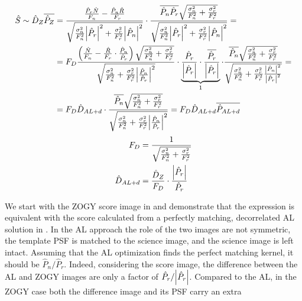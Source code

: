 \begin{align}
  \hat{S} \sim \hat{D}_Z\overline{\hat{P}_Z} &= \frac
  {\frac{\hat{P}_r\hat{N}}{F_n} - \frac{\hat{P}_n\hat{R}}{F_r}}
  {\sqrt{\frac{\sigma_n^2}{F_n^2}\abs{\hat{P}_r}^2 +
      \frac{\sigma_r^2}{F_r^2}\abs{\hat{P}_n}^2}}
  \cdot
  \frac{\overline{\hat{P}_n\hat{P}_r}\sqrt{\frac{\sigma_n^2}{F_n^2} + \frac{\sigma_r^2}{F_r^2}}}
  {\sqrt{\frac{\sigma_n^2}{F_n^2}\abs{\hat{P}_r}^2 +
      \frac{\sigma_r^2}{F_r^2}\abs{\hat{P}_n}^2}} = \label{eq:DzPz}\\
 &= F_D \frac
  {\left(\frac{\hat{N}}{F_n} -  \frac{\hat{R}}{F_r} \cdot
    \frac{\hat{P}_n}{\hat{P}_r}\right) \sqrt{\frac{\sigma_n^2}{F_n^2} + \frac{\sigma_r^2}{F_r^2}} }
  {\sqrt{\frac{\sigma_n^2}{F_n^2} +
      \frac{\sigma_r^2}{F_r^2}\abs{\frac{\hat{P}_n}{\hat{P}_r}}^2}}
  \cdot
  \underbrace{
  \frac{\hat{P}_r}{\abs{\hat{P}_r}}
  \cdot
  \frac{\overline{\hat{P}_r}}{\abs{\hat{P}_r}}
  }_{1} %
  \cdot
  \frac{\overline{\hat{P}_n}\sqrt{\frac{\sigma_n^2}{F_n^2} + \frac{\sigma_r^2}{F_r^2}}}
  {\sqrt{\frac{\sigma_n^2}{F_n^2} +
      \frac{\sigma_r^2}{F_r^2}\frac{\abs{\hat{P}_n}^2}{\abs{\hat{P}_r}^2}}} = \label{eq:DzPrPrPz}\\
  &= F_D \hat{D}_{AL+d} \cdot \frac{\overline{\hat{P}_n}
  \sqrt{\frac{\sigma_n^2}{F_n^2} + \frac{\sigma_r^2}{F_r^2}}}
  {\sqrt{\frac{\sigma_n^2}{F_n^2} +
      \frac{\sigma_r^2}{F_r^2}\abs{\frac{\hat{P}_n}{\hat{P}_r}}^2}} =
F_D \hat{D}_{AL+d}\overline{\hat{P}_{AL+d}}\label{eq:DaldPald}
\end{align}
%
%
\begin{align}
F_D &= \frac{1}{\sqrt{\frac{\sigma_n^2}{F_n^2} +
    \frac{\sigma_r^2}{F_r^2}}} \\
\hat{D}_{AL+d} &= \frac{\hat{D}_Z}{F_D}\cdot\frac{\abs{\hat{P}_r}}{\hat{P}_r}\label{eq:Dald}
\end{align}
%
\par We start with the ZOGY score image in  and
demonstrate that the expression is equivalent with the score
calculated from a perfectly matching, decorrelated AL solution in
.  In the AL approach the role of the two images are
not symmetric, the template PSF is matched to the science image, and
the science image is left intact. Assuming that the AL optimization
finds the perfect matching kernel, it should be
\(\hat{P}_n/\hat{P}_r\). Indeed, considering the score image, the
difference between the AL and ZOGY images are only a factor of
\(\hat{P}_r/\abs{\hat{P}_r}\). Compared to the AL, in the ZOGY case
both the difference image and its PSF carry an extra

